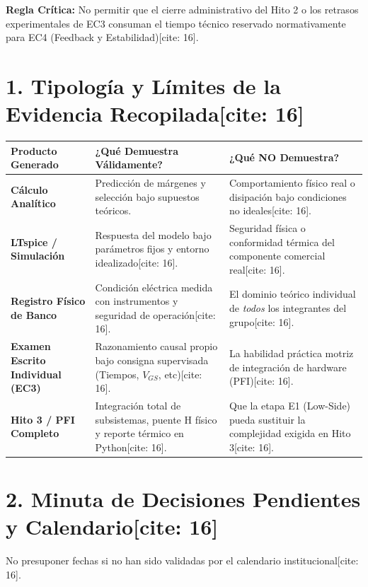 \documentclass[11pt, a4paper]{article}
\begin{document}
\begin{tcolorbox}[colback=red!5, colframe=red!70!black, title=\textbf{Documento Docente: Mapa de Evidencias y Protección del EC4[cite: 16]}]
    \textbf{Regla Crítica:} No permitir que el cierre administrativo del Hito 2 o los retrasos experimentales de EC3 consuman el tiempo técnico reservado normativamente para EC4 (Feedback y Estabilidad)[cite: 16].
\end{tcolorbox}

\section*{1. Tipología y Límites de la Evidencia Recopilada[cite: 16]}
\renewcommand{\arraystretch}{1.5}
\begin{tabularx}{\textwidth}{|>{\raggedright\arraybackslash}p{4cm}|>{\raggedright\arraybackslash}X|>{\raggedright\arraybackslash}X|}
\hline
\rowcolor{ucbblue!20}
\textbf{Producto Generado} & \textbf{¿Qué Demuestra Válidamente?} & \textbf{¿Qué NO Demuestra?} \\ \hline
\textbf{Cálculo Analítico} & Predicción de márgenes y selección bajo supuestos teóricos. & Comportamiento físico real o disipación bajo condiciones no ideales[cite: 16]. \\ \hline
\textbf{LTspice / Simulación} & Respuesta del modelo bajo parámetros fijos y entorno idealizado[cite: 16]. & Seguridad física o conformidad térmica del componente comercial real[cite: 16]. \\ \hline
\textbf{Registro Físico de Banco} & Condición eléctrica medida con instrumentos y seguridad de operación[cite: 16]. & El dominio teórico individual de \textit{todos} los integrantes del grupo[cite: 16]. \\ \hline
\textbf{Examen Escrito Individual (EC3)} & Razonamiento causal propio bajo consigna supervisada (Tiempos, $V_{GS}$, etc)[cite: 16]. & La habilidad práctica motriz de integración de hardware (PFI)[cite: 16]. \\ \hline
\textbf{Hito 3 / PFI Completo} & Integración total de subsistemas, puente H físico y reporte térmico en Python[cite: 16]. & Que la etapa E1 (Low-Side) pueda sustituir la complejidad exigida en Hito 3[cite: 16]. \\ \hline
\end{tabularx}

\vspace{0.5cm}
\section*{2. Minuta de Decisiones Pendientes y Calendario[cite: 16]}
No presuponer fechas si no han sido validadas por el calendario institucional[cite: 16].
\end{document}

